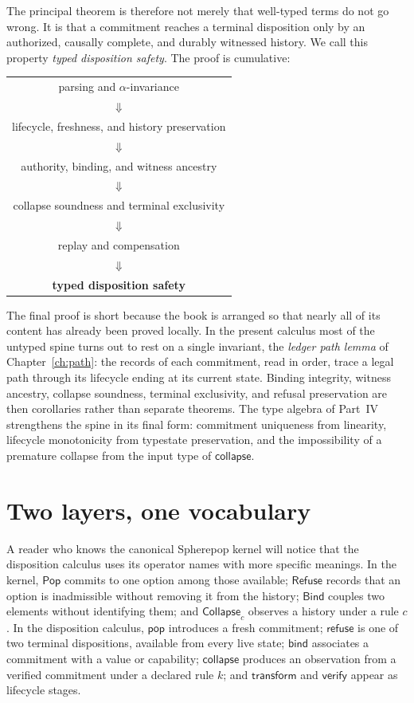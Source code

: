 \documentclass[11pt,openany]{book}
\theoremstyle{remark}
\newcommand{\Pop}{\mathsf{Pop}}
\newcommand{\Refuse}{\mathsf{Refuse}}
\newcommand{\Bind}{\mathsf{Bind}}
\newcommand{\Collapse}{\mathsf{Collapse}}
\begin{document}
The principal theorem is therefore not merely that well-typed terms do not
go wrong. It is that a commitment reaches a terminal disposition only by an
authorized, causally complete, and durably witnessed history. We call this
property \emph{typed disposition safety}. The proof is cumulative:
\begin{center}
\begin{tabular}{c}
parsing and $\alpha$-invariance\\
$\Downarrow$\\
lifecycle, freshness, and history preservation\\
$\Downarrow$\\
authority, binding, and witness ancestry\\
$\Downarrow$\\
collapse soundness and terminal exclusivity\\
$\Downarrow$\\
replay and compensation\\
$\Downarrow$\\
\textbf{typed disposition safety}
\end{tabular}
\end{center}
The final proof is short because the book is arranged so that nearly all of
its content has already been proved locally. In the present calculus most
of the untyped spine turns out to rest on a single invariant, the
\emph{ledger path lemma} of Chapter~\ref{ch:path}: the records of each
commitment, read in order, trace a legal path through its lifecycle ending
at its current state. Binding integrity, witness ancestry, collapse
soundness, terminal exclusivity, and refusal preservation are then
corollaries rather than separate theorems. The type algebra of Part~IV
strengthens the spine in its final form: commitment uniqueness from
linearity, lifecycle monotonicity from typestate preservation, and the
impossibility of a premature collapse from the input type of
$\mathsf{collapse}$.

\section*{Two layers, one vocabulary}

A reader who knows the canonical Spherepop kernel will notice that the
disposition calculus uses its operator names with more specific meanings.
In the kernel, $\Pop$ commits to one option among those available;
$\Refuse$ records that an option is inadmissible without removing it from
the history; $\Bind$ couples two elements without identifying them; and
$\Collapse_c$ observes a history under a rule $c$. In the disposition
calculus, $\mathsf{pop}$ introduces a fresh commitment; $\mathsf{refuse}$
is one of two terminal dispositions, available from every live state;
$\mathsf{bind}$ associates a commitment with a value or capability;
$\mathsf{collapse}$ produces an observation from a verified commitment
under a declared rule $k$; and $\mathsf{transform}$ and $\mathsf{verify}$
appear as lifecycle stages.
\end{document}
